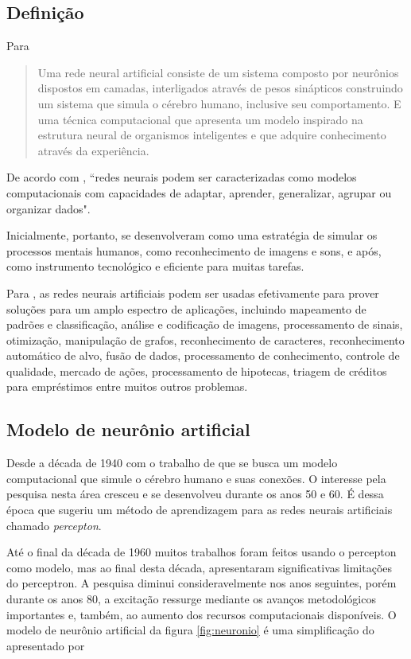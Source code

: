 \subsection{Definição}

Para \cite[p. 41]{santos_um_2013} \begin{quote}
	Uma rede neural artificial consiste de um sistema composto por neurônios dispostos em camadas, interligados através de pesos sinápticos construindo um sistema que simula o cérebro humano, inclusive seu comportamento. E uma técnica computacional que apresenta um modelo inspirado na estrutura neural de organismos inteligentes e que adquire conhecimento através da experiência.
\end{quote}

De acordo com \cite[p. 47]{lima_ia_2016}, ``redes neurais podem ser caracterizadas como modelos computacionais com capacidades de adaptar, aprender, generalizar, agrupar ou organizar dados".

Inicialmente, portanto, se desenvolveram como uma estratégia de simular os processos mentais humanos, como reconhecimento de imagens e sons, e após, como instrumento tecnológico e eficiente para muitas tarefas. \cite{jin_development_2002}	

Para \cite{obaidat_multilayer_1994}, as redes neurais artificiais podem ser usadas efetivamente para prover soluções para um amplo espectro de aplicações, incluindo mapeamento de padrões e classificação, análise e codificação de imagens, processamento de sinais, otimização, manipulação de grafos, reconhecimento de caracteres, reconhecimento automático de alvo,  	fusão de dados, processamento de conhecimento, controle de qualidade, mercado de ações, processamento de hipotecas, triagem de créditos para empréstimos entre muitos outros problemas. 

\subsection{Modelo de neurônio artificial}\label{perceptron}
Desde a década de 1940 com o trabalho de \cite{mcculloch_logical_1943} que se busca um modelo computacional que simule o cérebro humano e suas conexões. O interesse pela pesquisa nesta área cresceu e se desenvolveu durante os anos 50 e 60. É dessa época que \cite{rosenblatt_perceptron:_1958} sugeriu um método de aprendizagem para as redes neurais artificiais chamado \textit{percepton}. 

Até o final da década de 1960 muitos trabalhos foram feitos usando o percepton como modelo, mas ao final desta década, \cite{minsky_perceptrons:_1969} apresentaram significativas limitações do perceptron. A pesquisa diminui consideravelmente nos anos seguintes, porém durante  os  anos  80,  a excitação	ressurge mediante os avanços metodológicos importantes e, também, ao aumento dos recursos computacionais disponíveis. O  modelo  de  neurônio  artificial  da figura \ref{fig:neuronio} é uma
simplificação do apresentado por \cite[p. 36]{haykin_redes_2001}

